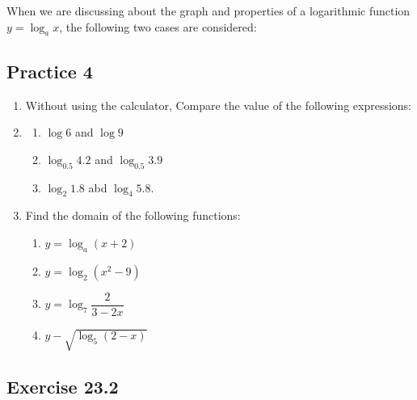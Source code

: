 \documentclass[12pt]{report}
\begin{document}
When we are discussing about the graph and properties of a logarithmic function
$y = \log_a x$, the following two cases are considered: \newpage

\subsection*{Practice 4}

\setlength{\columnseprule}{1pt}
\setlength{\columnsep}{24pt}

\begin{multicols}{2}
  \begin{enumerate}
    \item Without using the calculator, Compare the value of the following expressions:
    \item \begin{enumerate}
            \item $\log 6$ and $\log 9$
            \item $\log_{0.5} 4.2$ and $\log_{0.5} 3.9$
            \item $\log_2 1.8$ abd $\log_4 5.8$.
          \end{enumerate}
    \item Find the domain of the following functions:
          \begin{enumerate}
            \item $y = \log_a(x+2)$
            \item $y = \log_2(x^2 - 9)$
            \item $y = \log_7\dfrac{2}{3-2x}$
            \item $y - \sqrt{\log_5(2-x)}$
          \end{enumerate}
  \end{enumerate}
\end{multicols}

\subsection*{Exercise 23.2}

\setlength{\columnseprule}{1pt}
\setlength{\columnsep}{24pt}
\end{document}
